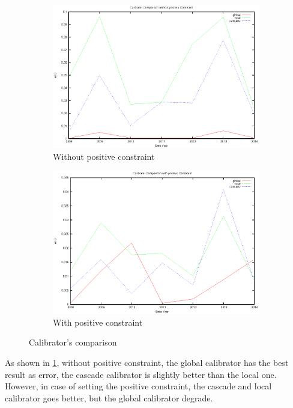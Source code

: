\documentclass[a4paper,10pt]{article}
\begin{document}
\begin{figure}[h]
\begin{subfigure}{.5\textwidth}
  \centering
  \includegraphics[scale=0.5]{Comparison_gNegative}
  \caption{Without positive constraint}
  \label{fig:comparison_negative}
\end{subfigure}%
\begin{subfigure}{.5\textwidth}
  \centering
  \includegraphics[scale=0.5]{Comparison_gPositive}
  \caption{With positive constraint}
  \label{fig:comparison_positive}
\end{subfigure}
\caption{Calibrator's comparison}
\label{fig:calibrator_comparison}
\end{figure}
As shown in \ref{fig:comparison_negative}, without positive constraint, the global calibrator has the best result as error, the cascade calibrator is slightly better than the local one. However, in case of setting the positive constraint, the cascade and local calibrator goes better, but the global calibrator degrade.
\end{document}
